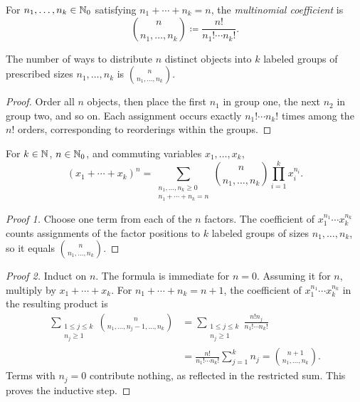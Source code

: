 \documentclass[11pt, oneside]{article}
\begin{document}
\begin{definition}
For $n_1, \ldots, n_k\in\mathbb{N}_0$ satisfying $n_1+\cdots+n_k=n$, the \emph{multinomial coefficient} is
\[
\binom{n}{n_1, \ldots, n_k}\coloneqq\frac{n!}{n_1!\cdots n_k!}.
\]
\end{definition}
\begin{proposition}
The number of ways to distribute $n$ distinct objects into $k$ labeled groups of prescribed sizes $n_1, \ldots, n_k$ is $\binom{n}{n_1, \ldots, n_k}$.
\end{proposition}
\begin{proof}
Order all $n$ objects, then place the first $n_1$ in group one, the next $n_2$ in group two, and so on. Each assignment occurs exactly $n_1!\cdots n_k!$ times among the $n!$ orders, corresponding to reorderings within the groups.
\end{proof}
\begin{theorem}\label{thm:multinomial}
For $k\in\mathbb{N}$, $n\in\mathbb{N}_0$, and commuting variables $x_1, \ldots, x_k$,
\[
(x_1+\cdots+x_k)^n=
\sum_{\substack{n_1, \ldots, n_k\ge0\\n_1+\cdots+n_k=n}}
\binom{n}{n_1, \ldots, n_k}\prod_{i=1}^k x_i^{n_i}.
\]
\end{theorem}
\begin{proof}[Proof 1]
Choose one term from each of the $n$ factors. The coefficient of $x_1^{n_1}\cdots x_k^{n_k}$ counts assignments of the factor positions to $k$ labeled groups of sizes $n_1, \ldots, n_k$, so it equals $\binom{n}{n_1, \ldots, n_k}$.
\end{proof}
\begin{proof}[Proof 2]
Induct on $n$. The formula is immediate for $n=0$. Assuming it for $n$, multiply by $x_1+\cdots+x_k$. For $n_1+\cdots+n_k=n+1$, the coefficient of $x_1^{n_1}\cdots x_k^{n_k}$ in the resulting product is
\[
\begin{aligned}
\sum_{\substack{1\le j\le k\\n_j\ge1}}
\binom{n}{n_1, \ldots, n_j-1, \ldots, n_k}
&=\sum_{\substack{1\le j\le k\\n_j\ge1}}
\frac{n!n_j}{n_1!\cdots n_k!}\\
&=\frac{n!}{n_1!\cdots n_k!}\sum_{j=1}^k n_j
=\binom{n+1}{n_1, \ldots, n_k}.
\end{aligned}
\]
Terms with $n_j=0$ contribute nothing, as reflected in the restricted sum. This proves the inductive step.
\end{proof}
\end{document}
